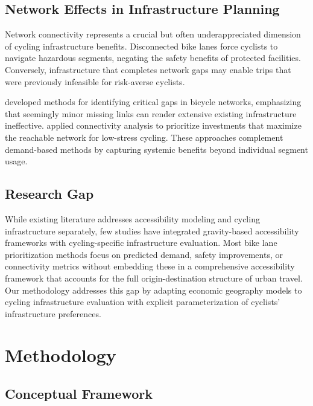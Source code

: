 \documentclass[12pt,a4paper]{article}
\begin{document}
\subsection{Network Effects in Infrastructure Planning}

Network connectivity represents a crucial but often underappreciated dimension of cycling infrastructure benefits. Disconnected bike lanes force cyclists to navigate hazardous segments, negating the safety benefits of protected facilities. Conversely, infrastructure that completes network gaps may enable trips that were previously infeasible for risk-averse cyclists.

\citet{lowry2016using} developed methods for identifying critical gaps in bicycle networks, emphasizing that seemingly minor missing links can render extensive existing infrastructure ineffective. \citet{furth2016network} applied connectivity analysis to prioritize investments that maximize the reachable network for low-stress cycling. These approaches complement demand-based methods by capturing systemic benefits beyond individual segment usage.

\subsection{Research Gap}

While existing literature addresses accessibility modeling and cycling infrastructure separately, few studies have integrated gravity-based accessibility frameworks with cycling-specific infrastructure evaluation. Most bike lane prioritization methods focus on predicted demand, safety improvements, or connectivity metrics without embedding these in a comprehensive accessibility framework that accounts for the full origin-destination structure of urban travel. Our methodology addresses this gap by adapting economic geography models to cycling infrastructure evaluation with explicit parameterization of cyclists' infrastructure preferences.

\section{Methodology}
\label{sec:methodology}

\subsection{Conceptual Framework}
\end{document}
